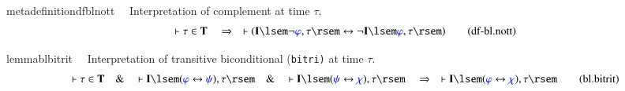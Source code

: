 \begin{restatable}{metadefinition}{dfblnott}~~ Interpretation of complement at time
$\tau$.
\begin{align}
\vdash \tau \in \mathbf{T}\quad\Rightarrow\quad \vdash ( \mathbf{I} \lsem \lnot
    \mw{\varphi} , \tau \rsem \leftrightarrow \lnot \mathbf{I} \lsem
    \mw{\varphi} , \tau \rsem )\label{eq:df-bl.nott}\tag{df-bl.nott}
\end{align}
\end{restatable}

\begin{restatable}{lemma}{blbitrit}~~ Interpretation of transitive
biconditional ({\tt bitri)} at time $\tau$.
\begin{align}
\vdash \tau \in \mathbf{T}\quad\&\quad \vdash \mathbf{I} \lsem ( \mw{\varphi}
    \leftrightarrow \mw{\psi} ) , \tau \rsem\quad\&\quad \vdash \mathbf{I}
    \lsem ( \mw{\psi} \leftrightarrow \mw{\chi} ) , \tau
    \rsem\quad\Rightarrow\quad \vdash \mathbf{I} \lsem ( \mw{\varphi}
    \leftrightarrow \mw{\chi} ) , \tau \rsem\label{eq:bl.bitrit}\tag{bl.bitrit}
\end{align}
\end{restatable}

